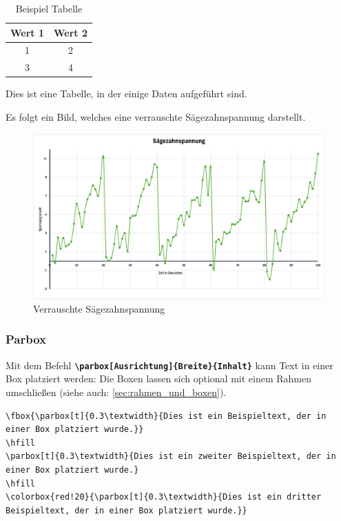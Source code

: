 \begin{minipage}[c]{0.45\textwidth}
    \begin{table}[H]
        \centering
        \begin{tabular}{|c|c|}
            \hline
            \textbf{Wert 1} & \textbf{Wert 2} \\
            \hline
            1               & 2               \\
            3               & 4               \\
            \hline
        \end{tabular}
        \caption{Beispiel Tabelle}
        \label{tab:beispiel_tabelle}
    \end{table}
    Dies ist eine Tabelle, in der einige Daten aufgeführt sind.
\end{minipage}
\hfill
\begin{minipage}[c]{0.45\textwidth}
    Es folgt ein Bild, welches eine verrauschte Sägezahnspannung darstellt.
    \begin{figure}[H]
        \centering
        \includegraphics[width=0.8\linewidth]{anlagen/bilder/Graph.png}
        \caption{Verrauschte Sägezahnspannung}
        \label{fig:verrauschte_saegezahnspannung}
    \end{figure}
\end{minipage}

\subsubsection{Parbox}
Mit dem Befehl \textbf{\texttt{\textbackslash parbox[Ausrichtung]\{Breite\}\{Inhalt\}}} kann Text in einer Box platziert werden:
Die Boxen lassen sich optional mit einem Rahmen umschließen (siehe auch: \autoref{sec:rahmen_und_boxen}).

\begin{lstlisting}[language={[LaTeX]TeX}, basicstyle=\small\ttfamily]
\fbox{\parbox[t]{0.3\textwidth}{Dies ist ein Beispieltext, der in einer Box platziert wurde.}}
\hfill
\parbox[t]{0.3\textwidth}{Dies ist ein zweiter Beispieltext, der in einer Box platziert wurde.}
\hfill
\colorbox{red!20}{\parbox[t]{0.3\textwidth}{Dies ist ein dritter Beispieltext, der in einer Box platziert wurde.}}
\end{lstlisting}

